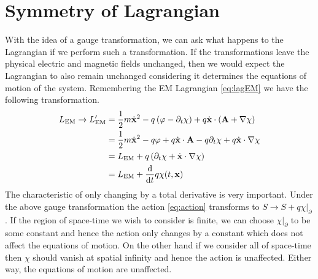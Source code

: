 \section{Symmetry of Lagrangian}
With the idea of a gauge transformation, we can ask what happens to the Lagrangian if we perform such a transformation. If the transformations leave the physical electric and magnetic fields unchanged, then we would expect the Lagrangian to also remain unchanged considering it determines the equations of motion of the system. Remembering the EM Lagrangian \ref{eq:lagEM} we have the following transformation.
\begin{align*}
L_\text{EM}\to L_\text{EM}' & = \frac{1}{2}m\dot{\mathbf{x}}^2 - q\left(\varphi - \partial_t\chi\right) + q\dot{\mathbf{x}}\cdot\left(\mathbf{A} + \nabla\chi\right) \\
 & = \frac{1}{2}m\dot{\mathbf{x}}^2 - q\varphi + q\dot{\mathbf{x}}\cdot\mathbf{A} - q\partial_t\chi + q\dot{\mathbf{x}}\cdot\nabla\chi \\
 & = L_\text{EM} + q\left(\partial_t\chi + \dot{\mathbf{x}}\cdot\nabla\chi\right) \\
 & = L_\text{EM} + \dv{t}q\chi(t,\mathbf{x})
\end{align*}
The characteristic of only changing by a total derivative is very important. Under the above gauge transformation the action \ref{eq:action} transforms to $S\to S + q\chi|_\partial$. If the region of space-time we wish to consider is finite, we can choose $\chi|_\partial$ to be some constant and hence the action only changes by a constant which does not affect the equations of motion. On the other hand if we consider all of space-time then $\chi$ should vanish at spatial infinity and hence the action is unaffected. Either way, the equations of motion are unaffected.

